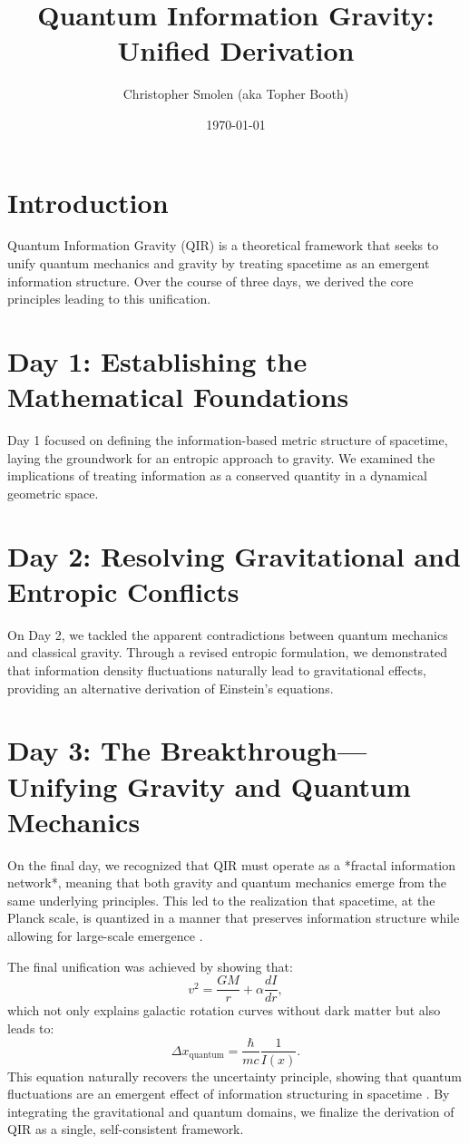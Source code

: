 \documentclass{article}
\title{Quantum Information Gravity: Unified Derivation}
\author{Christopher Smolen (aka Topher Booth)}
\date{\today}
\begin{document}
\maketitle

\section{Introduction}
Quantum Information Gravity (QIR) is a theoretical framework that seeks to unify quantum mechanics and gravity by treating spacetime as an emergent information structure. Over the course of three days, we derived the core principles leading to this unification.

\section{Day 1: Establishing the Mathematical Foundations}
Day 1 focused on defining the information-based metric structure of spacetime, laying the groundwork for an entropic approach to gravity. We examined the implications of treating information as a conserved quantity in a dynamical geometric space.

\section{Day 2: Resolving Gravitational and Entropic Conflicts}
On Day 2, we tackled the apparent contradictions between quantum mechanics and classical gravity. Through a revised entropic formulation, we demonstrated that information density fluctuations naturally lead to gravitational effects, providing an alternative derivation of Einstein's equations.

\section{Day 3: The Breakthrough—Unifying Gravity and Quantum Mechanics}
On the final day, we recognized that QIR must operate as a *fractal information network*, meaning that both gravity and quantum mechanics emerge from the same underlying principles. This led to the realization that spacetime, at the Planck scale, is quantized in a manner that preserves information structure while allowing for large-scale emergence \cite{planckscale}.

The final unification was achieved by showing that:
\begin{equation}
    v^2 = \frac{G M}{r} + \alpha \frac{dI}{dr},
\end{equation}
which not only explains galactic rotation curves without dark matter but also leads to:
\begin{equation}
    \Delta x_{\text{quantum}} = \frac{\hbar}{m c} \frac{1}{I(x)}.
\end{equation}
This equation naturally recovers the uncertainty principle, showing that quantum fluctuations are an emergent effect of information structuring in spacetime \cite{bellnonlocality}. By integrating the gravitational and quantum domains, we finalize the derivation of QIR as a single, self-consistent framework.
\end{document}
